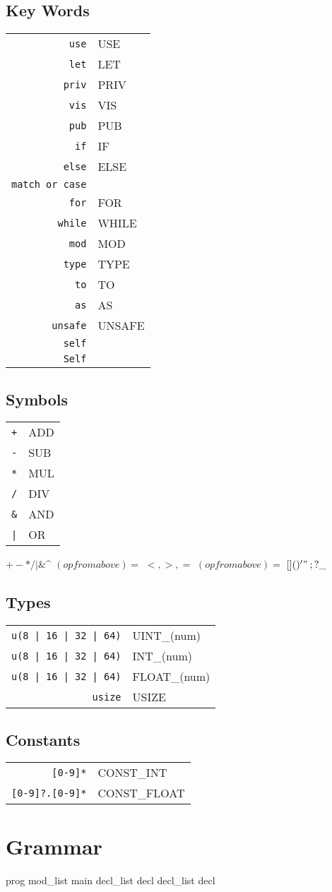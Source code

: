 \documentclass{article}
\begin{document}
		\subsection{Key Words}
			\begin{tabular}{rl}
				\texttt{use} & USE\\
				\texttt{let} & LET\\
				\texttt{priv} & PRIV\\
				\texttt{vis} & VIS\\
				\texttt{pub} & PUB\\
				\texttt{if} & IF\\
				\texttt{else} & ELSE\\ 
				\texttt{match or case} & \\
				\texttt{for} & FOR\\
				\texttt{while} & WHILE\\
				\texttt{mod} & MOD\\
				\texttt{type} & TYPE \\
				\texttt{to} & TO\\
				\texttt{as} & AS\\
				\texttt{unsafe} & UNSAFE\\
				\texttt{self} & \\
				\texttt{Self} & \\
			\end{tabular}
		\subsection{Symbols}
			\begin{tabular}{rl}
				\texttt{+} & ADD\\
				\texttt{-} & SUB\\
				\texttt{*} & MUL\\
				\texttt{/} & DIV\\
				\texttt{\&} & AND\\
				\texttt{|} & OR\\

			\end{tabular}
			$+ - * / | \& \^$
			$(op from above)=$
			$<, >, =$
			$(op from above)=$
			$[ ]
			( )
			{ }
			' "
			\: ;
			? \_$
		\subsection{Types}	
			\begin{tabular}{rl}
				\texttt{u(8 | 16 | 32 | 64)} & UINT\_(num)\\
				\texttt{u(8 | 16 | 32 | 64)} & INT\_(num)\\
				\texttt{u(8 | 16 | 32 | 64)}  & FLOAT\_(num)\\
				\texttt{usize} & USIZE\\ 
			\end{tabular}
		\subsection{Constants}
			\begin{tabular}{rl}
				\texttt{[0-9]*} & CONST\_INT\\
				\texttt{[0-9]?.[0-9]*} & CONST\_FLOAT\\
			\end{tabular}
	\section{Grammar}
		prog
			mod\_list main 
		decl\_list
			decl decl\_list 
		decl 
\end{document}
